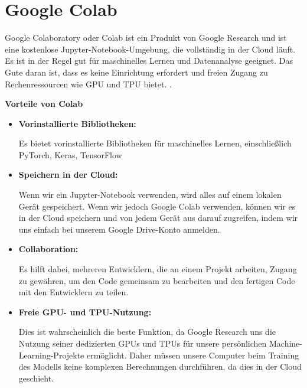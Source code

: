 %
%



\chapter{Google Colab}

Google Colaboratory oder Colab ist ein Produkt von Google Research und ist eine kostenlose Jupyter-Notebook-Umgebung, die vollständig in der Cloud läuft. Es ist in der Regel gut für maschinelles Lernen und Datenanalyse geeignet. Das Gute daran ist, dass es keine Einrichtung erfordert und freien Zugang zu Rechenressourcen wie GPU und TPU bietet. \cite{GoogleColab:2021}.

\bigskip

\textbf{Vorteile von Colab} 

\begin{itemize}  
	\item \textbf{Vorinstallierte Bibliotheken:}
	
	Es bietet vorinstallierte Bibliotheken für maschinelles Lernen, einschließlich PyTorch, Keras, TensorFlow
	\item \textbf{Speichern in der Cloud:}
	
	Wenn wir ein Jupyter-Notebook verwenden, wird alles auf einem lokalen Gerät gespeichert. Wenn wir jedoch Google Colab verwenden, können wir es in der Cloud speichern und von jedem Gerät aus darauf zugreifen, indem wir uns einfach bei unserem Google Drive-Konto anmelden.
	\item \textbf{Collaboration:}
	
	Es hilft dabei, mehreren Entwicklern, die an einem Projekt arbeiten, Zugang zu gewähren, um den Code gemeinsam zu bearbeiten und den fertigen Code mit den Entwicklern zu teilen.
	\item \textbf{Freie GPU- und TPU-Nutzung:}  
	
	Dies ist wahrscheinlich die beste Funktion, da Google Research uns die Nutzung seiner dedizierten GPUs und TPUs für unsere persönlichen Machine-Learning-Projekte ermöglicht. Daher müssen unsere Computer beim Training des Modells keine komplexen Berechnungen durchführen, da dies in der Cloud geschieht.
	
\end{itemize}

